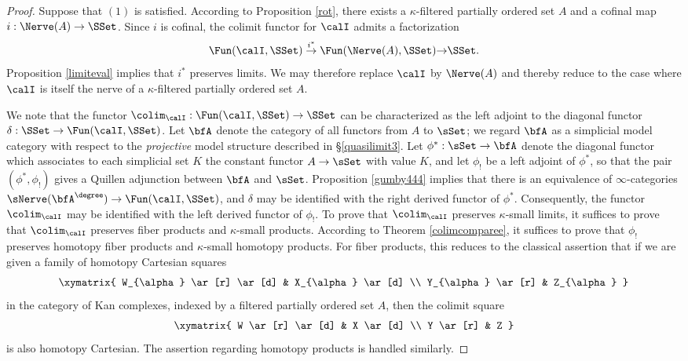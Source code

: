 \begin{proof}
Suppose that $(1)$ is satisfied. According to Proposition \ref{rot}, there exists a $\kappa$-filtered partially ordered set $A$ and a cofinal map $i: \Nerve(A) \rightarrow \SSet$. Since $i$ is cofinal, the colimit functor for $\calI$ admits a factorization
$$ \Fun(\calI,\SSet) \stackrel{i^{\ast}}{\rightarrow} \Fun(\Nerve(A), \SSet) {\rightarrow} \SSet.$$
Proposition \ref{limiteval} implies that $i^{\ast}$ preserves limits. We may therefore replace
$\calI$ by $\Nerve(A)$ and thereby reduce to the case where $\calI$ is itself the nerve of a $\kappa$-filtered partially ordered set $A$.

We note that the functor $\colim_{\calI}: \Fun(\calI, \SSet) \rightarrow \SSet$ can be characterized as the
left adjoint to the diagonal functor $\delta: \SSet \rightarrow \Fun(\calI,\SSet)$. Let $\bfA$ denote the category
of all functors from $A$ to $\sSet$; we regard $\bfA$ as a simplicial model category with respect to the {\em projective} model structure described in \S \ref{quasilimit3}. Let $\phi^{\ast}: \sSet \rightarrow \bfA$ denote the diagonal functor which associates to each simplicial set $K$ the constant functor $A \rightarrow \sSet$ with value $K$, and let $\phi_{!}$ be a left adjoint of
$\phi^{\ast}$, so that the pair $(\phi^{\ast}, \phi_{!})$ gives a Quillen adjunction between
$\bfA$ and $\sSet$. Proposition \ref{gumby444} implies that there is an equivalence of $\infty$-categories $\sNerve(\bfA^{\degree}) \rightarrow
\Fun(\calI,\SSet)$, and $\delta$ may be identified with the right derived functor of $\phi^{\ast}$. Consequently, the functor $\colim_{\calI}$ may be identified with the left derived functor of $\phi_{!}$. To prove that $\colim_{\calI}$ preserves $\kappa$-small limits, it suffices to prove that $\colim_{\calI}$ preserves fiber products and $\kappa$-small products. According to Theorem \ref{colimcomparee}, it suffices to prove that
$\phi_{!}$ preserves homotopy fiber products and $\kappa$-small homotopy products. For fiber products, this reduces to the classical assertion that if we are given a family of homotopy
Cartesian squares
$$ \xymatrix{ W_{\alpha} \ar[r] \ar[d] & X_{\alpha} \ar[d] \\
Y_{\alpha} \ar[r] & Z_{\alpha} }$$
in the category of Kan complexes, indexed by a filtered partially ordered set $A$, then the colimit square
$$ \xymatrix{ W \ar[r] \ar[d] & X \ar[d] \\
Y \ar[r] & Z }$$
is also homotopy Cartesian. The assertion regarding homotopy products is handled similarly.


\end{proof}
